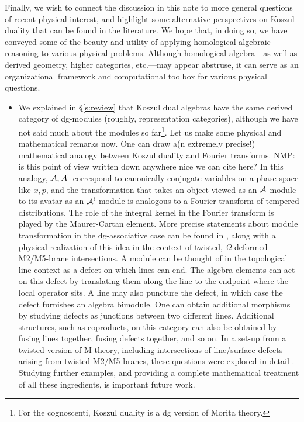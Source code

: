 \documentclass[11pt]{amsart}
\def\natalie#1{{\textcolor{green!65!black}{NMP: {#1}}}}
\begin{document}
Finally, we wish to connect the discussion in this note to more general questions of recent physical interest, and highlight some alternative perspectives on Koszul duality that can be found in the literature. We hope that, in doing so, we have conveyed some of the beauty and utility of applying homological algebraic reasoning to various physical problems. Although homological algebra---as well as derived geometry, higher categories, etc.---may appear abstruse, it can serve as an organizational framework and computational toolbox for various physical questions.
\begin{itemize}
\item We explained in \S \ref{s:review} that Koszul dual algebras have the same derived category of dg-modules (roughly, representation categories), although we have not said much about the modules so far\footnote{For the cognoscenti, Koszul duality is a dg version of Morita theory.}. Let us make some physical and mathematical remarks now. One can draw a(n extremely precise!) mathematical analogy between Koszul duality and Fourier transforms. \natalie{is this point of view written down anywhere nice we can cite here?} In this analogy, $\mathcal A, \mathcal A^{!}$ correspond to canonically conjugate variables on a phase space like $x, p$, and the transformation that takes an object viewed as an $\mathcal A$-module to its avatar as an $\mathcal A^{!}$-module is analogous to a Fourier transform of tempered distributions. The role of the integral kernel in the Fourier transform is played by the Maurer-Cartan element.  More precise statements about module transformation in the dg-associative case can be found in \cite{GO}, along with a physical realization of this idea in the context of twisted, $\Omega$-deformed M2/M5-brane intersections. A module can be thought of in the topological line context as a defect on which lines can end. The algebra elements can act on this defect by translating them along the line to the endpoint where the local operator sits. A line may also puncture the defect, in which case the defect furnishes an algebra bimodule. One can obtain additional morphisms by studying defects as junctions between two different lines.  Additional structures, such as coproducts, on this category can also be obtained by fusing lines together, fusing defects together, and so on. In a set-up from a twisted version of M-theory, including intersections of line/surface defects arising from twisted M2/M5 branes, these questions were explored in detail \cite{GR}. Studying further examples, and providing a complete mathematical treatment of all these ingredients, is important future work. \\

\end{itemize}
\end{document}
